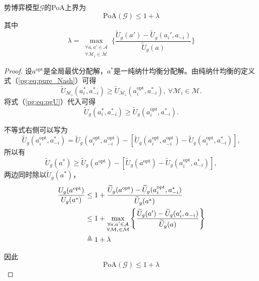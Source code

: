 \begin{proposition}
\label{pg:pro:PoA}
	势博弈模型$\mathcal{G}$的PoA上界为
	\begin{equation}
	\label{pg:pro:eq:High_Bound_PoA}
		\mathrm{PoA}(\mathcal{G}) \leq 1 + \lambda
	\end{equation}
	其中
	\begin{equation}
	\label{pg:pro:eq:lambda_PoA}
		\lambda = \max_{\substack{\forall a,a' \in \mathcal{A}\\ \forall \mathcal{M}_i \in \mathcal{M}}} \Bigg\{ \frac{\widetilde U_g(a') - \widetilde U_g(a_i',a_{-i})}{\widetilde U_g(a)} \Bigg\}
	\end{equation}
	
	\begin{proof}
		设$a^{\text{opt}}$是全局最优分配解，$a^*$是一纯纳什均衡分配解。由纯纳什均衡的定义式（\ref{pg:eq:pure_Nash}）可得
		\begin{equation}
		\label{pg:pro:eq:inequality_Um}
			\widetilde U_{\mathcal{M}_i}(a_i^*,a_{-i}^*) \geq \widetilde U_{\mathcal{M}_i}(a_i^{\text{opt}},a_{-i}^*),\ \forall \mathcal{M}_i \in \mathcal{M}.
		\end{equation}
		将式（\ref{pg:eq:pgU}）代入可得
		\begin{equation}
		\label{pg:pro:eq:inequality_Ug}
			\widetilde U_g(a_i^*,a_{-i}^*) \geq \widetilde U_g(a_i^{\text{opt}},a_{-i}^*).
		\end{equation}
		
		不等式右侧可以写为
		\begin{equation}
		\label{pg:pro:eq:rewrite}
			\widetilde U_g(a_i^{\text{opt}},a_{-i}^*) = \widetilde U_g(a_i^{\text{opt}},a_{-i}^{\text{opt}}) - [\widetilde U_g(a_i^{\text{opt}},a_{-i}^{\text{opt}}) - \widetilde U_g(a_i^{\text{opt}},a_{-i}^*)],
		\end{equation}
		所以有
		\begin{equation}
		\label{pg:pro:eq:relation_opt_nash}
			\widetilde U_g(a^*) \geq \widetilde U_g(a^{\text{opt}}) - [\widetilde U_g(a^{\text{opt}}) - \widetilde U_g(a_i^{\text{opt}},a_{-i}^*)],
		\end{equation}
		两边同时除以$\widetilde U_g(a^*)$，
		\begin{align}
		\label{pg:pro:eq:cal_PoA}
			\frac{U_g(a^{\text{opt}})}{U_g(a^*)} &\leq 1 + \frac{\widetilde U_g(a^{\text{opt}}) - \widetilde U_g(a_i^{\text{opt}},a_{-i}^*)}{\widetilde U_g(a^*)}\notag\\
			&\leq 1 + \max_{\substack{\forall a,a' \in \mathcal{A}\\ \forall \mathcal{M}_i \in \mathcal{M}}} \Bigg\{ \frac{\widetilde U_g(a') - \widetilde U_g(a_i',a_{-i})}{\widetilde U_g(a)} \Bigg\}\notag\\
			&\triangleq 1 +\lambda
		\end{align}
		
		因此
		\begin{equation}
		\label{pg:pro:eq:comclusion_PoA}
			\mathrm{PoA}(\mathcal{G}) \leq 1 + \lambda
		\end{equation}
	\end{proof}
\end{proposition}


